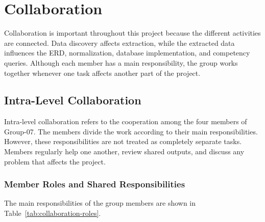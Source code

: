 \section{Collaboration}
\label{sec:collaboration}

Collaboration is important throughout this project because the different
activities are connected. Data discovery affects extraction, while the
extracted data influences the ERD, normalization, database implementation,
and competency queries. Although each member has a main responsibility,
the group works together whenever one task affects another part of the
project.

\subsection{Intra-Level Collaboration}
\label{subsec:intra-level-collaboration}

Intra-level collaboration refers to the cooperation among the four members
of Group-07. The members divide the work according to their main
responsibilities. However, these responsibilities are not treated as
completely separate tasks. Members regularly help one another, review
shared outputs, and discuss any problem that affects the project.

\subsubsection{Member Roles and Shared Responsibilities}

The main responsibilities of the group members are shown in
Table~\ref{tab:collaboration-roles}.

